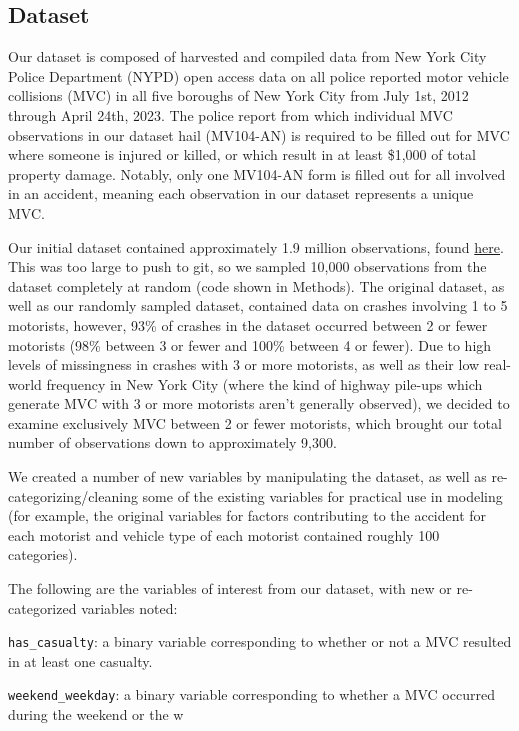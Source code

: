 \documentclass[
  letterpaper,
  DIV=11,
  numbers=noendperiod]{scrartcl}
\begin{document}
\hypertarget{dataset}{%
\subsection{Dataset}\label{dataset}}

Our dataset is composed of harvested and compiled data from New York
City Police Department (NYPD) open access data on all police reported
motor vehicle collisions (MVC) in all five boroughs of New York City
from July 1st, 2012 through April 24th, 2023. The police report from
which individual MVC observations in our dataset hail (MV104-AN) is
required to be filled out for MVC where someone is injured or killed, or
which result in at least \$1,000 of total property damage. Notably, only
one MV104-AN form is filled out for all involved in an accident, meaning
each observation in our dataset represents a unique MVC.

Our initial dataset contained approximately 1.9 million observations,
found
\href{https://www.kaggle.com/datasets/utkarshx27/motor-vehicle-collisions?resource=download}{here}.
This was too large to push to git, so we sampled 10,000 observations
from the dataset completely at random (code shown in Methods). The
original dataset, as well as our randomly sampled dataset, contained
data on crashes involving 1 to 5 motorists, however, 93\% of crashes in
the dataset occurred between 2 or fewer motorists (98\% between 3 or
fewer and 100\% between 4 or fewer). Due to high levels of missingness
in crashes with 3 or more motorists, as well as their low real-world
frequency in New York City (where the kind of highway pile-ups which
generate MVC with 3 or more motorists aren't generally observed), we
decided to examine exclusively MVC between 2 or fewer motorists, which
brought our total number of observations down to approximately 9,300.

We created a number of new variables by manipulating the dataset, as
well as re-categorizing/cleaning some of the existing variables for
practical use in modeling (for example, the original variables for
factors contributing to the accident for each motorist and vehicle type
of each motorist contained roughly 100 categories).

The following are the variables of interest from our dataset, with new
or re-categorized variables noted:

\texttt{has\_casualty}: a binary variable corresponding to whether or
not a MVC resulted in at least one casualty.

\texttt{weekend\_weekday}: a binary variable corresponding to whether a
MVC occurred during the weekend or the w
\end{document}
